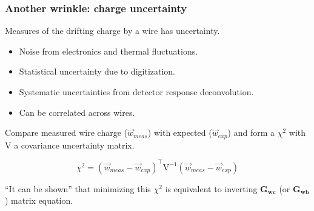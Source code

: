 \documentclass[xcolor=dvipsnames]{beamer}
\begin{document}
\begin{frame}
  \frametitle{Another wrinkle: charge uncertainty}

  Measures of the drifting charge by a wire has uncertainty.
  \begin{itemize}
  \item Noise from electronics and thermal fluctuations.
  \item Statistical uncertainty due to digitization.
  \item Systematic uncertainties from detector response deconvolution.
  \item Can be correlated across wires.
  \end{itemize}
  Compare measured wire charge ($\vec{w}_{meas}$) with expected
  ($\vec{w}_{exp}$) and form a $\chi^2$ with $\mathrm{V}$ a
  covariance uncertainty matrix.
  
  \[\chi^2 = (\vec{w}_{meas}-\vec{w}_{exp})^\intercal\mathrm{V}^{-1} (\vec{w}_{meas}-\vec{w}_{exp})\]

  ``It can be shown'' that minimizing this $\chi^2$ is equivalent to
  inverting $\mathbf{G_{wc}}$ (or $\mathbf{G_{wb}}$) matrix equation.

\end{frame}
\end{document}
